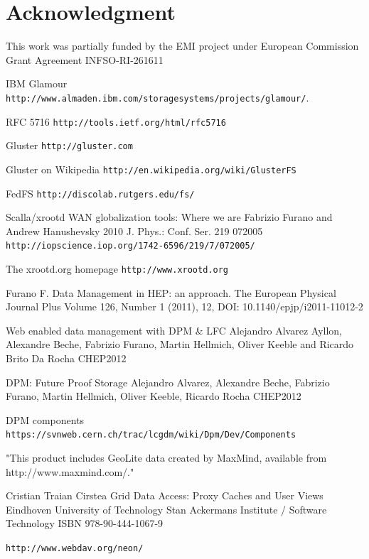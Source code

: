 \documentclass[12pt]{article} %
\begin{document}
\section*{Acknowledgment}

This work was partially funded by the EMI project under European
Commission Grant Agreement INFSO-RI-261611



\begin{thebibliography}{9}

 IBM Glamour \lstinline"http://www.almaden.ibm.com/storagesystems/projects/glamour/". 


 RFC 5716
\lstinline"http://tools.ietf.org/html/rfc5716"


 Gluster
\lstinline"http://gluster.com"

 Gluster on Wikipedia
\lstinline"http://en.wikipedia.org/wiki/GlusterFS"


 FedFS
\lstinline"http://discolab.rutgers.edu/fs/"

 Scalla/xrootd WAN globalization tools: Where we are
Fabrizio Furano and Andrew Hanushevsky 2010 J. Phys.: Conf. Ser. 219 072005
\lstinline"http://iopscience.iop.org/1742-6596/219/7/072005/"

 The xrootd.org homepage
\lstinline"http://www.xrootd.org"

Furano F. Data Management in HEP: an approach. 
The European Physical Journal Plus
Volume 126, Number 1 (2011), 12, DOI: 10.1140/epjp/i2011-11012-2

Web enabled data management with DPM \& LFC
Alejandro Alvarez Ayllon, Alexandre Beche, Fabrizio Furano, Martin Hellmich, Oliver Keeble and Ricardo Brito Da Rocha
CHEP2012

DPM: Future Proof Storage
Alejandro Alvarez, Alexandre Beche, Fabrizio Furano, Martin Hellmich, Oliver Keeble, Ricardo Rocha
CHEP2012

 DPM components
\lstinline"https://svnweb.cern.ch/trac/lcgdm/wiki/Dpm/Dev/Components"

"This product includes GeoLite data created by MaxMind, available from http://www.maxmind.com/."

Cristian Traian Cirstea
Grid Data Access: Proxy Caches and User Views
Eindhoven University of Technology
Stan Ackermans Institute / Software Technology
ISBN 978-90-444-1067-9


\lstinline"http://www.webdav.org/neon/"

\end{thebibliography}
\end{document}
